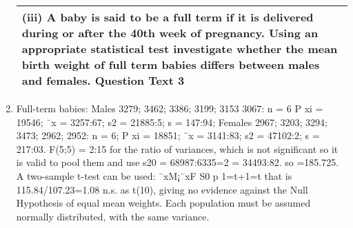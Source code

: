 \documentclass[a4paper,12pt]{article}
\begin{document}
\begin{enumerate}
\begin{table}[ht!]
\begin{tabular}{|p{15cm}|}
\hline  
 
(iii) A baby is said to be a full term if it is delivered during or after the 40th week of pregnancy.  
Using an appropriate statistical test investigate whether the mean birth weight of full term babies differs between males and females.  
Question Text 3 

\\ \hline
  
\end{tabular}

\end{table}
\item Full-term babies:
Males 3279; 3462; 3386; 3199; 3153 3067: n = 6
P
xi = 19546; ¯x = 3257:67; s2 =
21885:5; s = 147:94;
Females 2967; 3203; 3294; 3473; 2962; 2952: n = 6;
P
xi = 18851; ¯x = 3141:83; s2 =
47102:2; s = 217:03.
F(5;5) = 2:15 for the ratio of variances, which is not significant so it is valid to pool them
and use s20
= 68987:6335=2 = 34493:82. so =185.725.
A two-sample t-test can be used: ¯xM¡¯xF
S0
p
1=t+1=t
that is 115.84/107.23=1.08 n.s. as t(10),
giving no evidence against the Null Hypothesis of equal mean weights. Each population
must be assumed normally distributed, with the same variance.
\end{enumerate}
\end{document}
